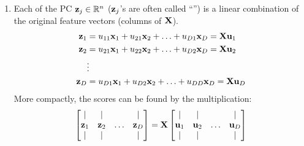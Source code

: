 \documentclass[a4paper]{article}
\begin{document}
\begin{enumerate}
	\item Each of the PC $\textbf{z}_j \in \mathbb{R}^n$ ($\textbf{z}_j$'s are often called ``'') is a linear combination of the original feature vectors (columns of $\textbf{X}$).
	\begin{equation}
	  		\begin{aligned}
			\textbf{z}_1 &= u_{11}\textbf{x}_1 + u_{21}\textbf{x}_2 + \ldots + u_{D1}\textbf{x}_D = \textbf{X}\textbf{u}_1  \\
			\textbf{z}_2 &= u_{21}\textbf{x}_1 + u_{22}\textbf{x}_2 + \ldots + u_{D2}\textbf{x}_D = \textbf{X}\textbf{u}_2  \\
			&\vdots\\
			\textbf{z}_D &= u_{D1}\textbf{x}_1 + u_{D2}\textbf{x}_2 + \ldots + u_{DD}\textbf{x}_D = \textbf{X}\textbf{u}_D 
		\end{aligned}  
		\label{eq:pc_score_as_product}
	   \end{equation}
	   More compactly, the scores can be found by the multiplication:
	   \begin{equation}
	    \begin{bmatrix}
	    | & | & & | \\
	    \textbf{z}_1 & \textbf{z}_2 & \ldots & \textbf{z}_D \\
	     | & | & & | \\
	    \end{bmatrix} = 
	    \textbf{X}
	    \begin{bmatrix}
	    | & | & & | \\
	    \textbf{u}_1 & \textbf{u}_2 & \ldots & \textbf{u}_D \\
	     | & | & & | \\
	    \end{bmatrix}
	    \label{eq:pc_score_as_product_compact}
	   \end{equation}


\end{enumerate}
\end{document}
